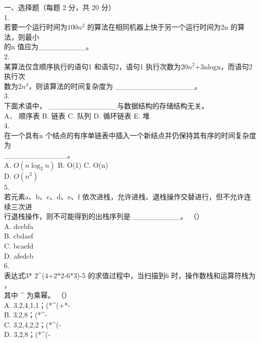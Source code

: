 
\begin{question}
一、选择题（每题 2 分，共 20 分）\\
1.\\
若要一个运行时间为$100n^2$ 的算法在相同机器上快于另一个运行时间为2n 的算法，则最小\\
的n 值应为\_\_\_\_\_\_\_\_\_。\\
2.\\
某算法仅含顺序执行的语句1 和语句2，语句1 执行次数为$20n^2$+3nlogn，而语句2 执行次\\
数为$2n^3$，则该算法的时间复杂度为 \_\_\_\_\_\_\_\_\_\_\_\_\_\_\_。\\
3.\\
下面术语中， \_\_\_\_\_\_\_\_\_\_\_\_\_与数据结构的存储结构无关。\\
A． 顺序表       B.  链表      C.  队列     D. 循环链表     E. 堆\\
4.\\
在一个具有n 个结点的有序单链表中插入一个新结点并仍保持其有序的时间复杂度为\\
\_\_\_\_\_\_\_\_\_\_\_\_。\\
A.  $O(n\log_2 n)$      B.  O(1)       C.  O(n)\\
D.  $O(n^2)$\\
5.\\
若元素a、b、c、d、e、f 依次进栈，允许进栈、退栈操作交替进行，但不允许连续三次进\\
行退栈操作，则不可能得到的出栈序列是 \_\_\_\_\_\_\_\_\_。 （\quad）\\
A.  dcebfa\\
B.  cbdaef\\
C.  bcaefd\\
D.  afedcb\\
6.\\
表达式3* 2\textasciicircum{}(4+2*2-6*3)-5 的求值过程中，当扫描到6 时，操作数栈和运算符栈为       ，\\
其中 \textasciicircum{} 为乘幂。 （\quad）\\
A.  3,2,4,1,1；(*\textasciicircum{}(+*-\\
B.  3,2,8；(*\textasciicircum{}-\\
C.  3,2,4,2,2；(*\textasciicircum{}(-\\
D.  3,2,8；(*\textasciicircum{}(-\\

\end{question}
